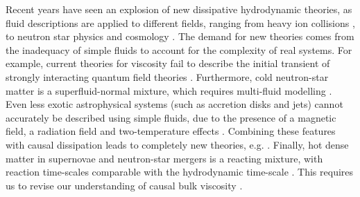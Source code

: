 \documentclass[a4paper, amsfonts, amssymb, amsmath, reprint, showkeys, nofootinbib, twoside, onecolumn,notitlepage]{revtex4-1}
\begin{document}
Recent years have seen an explosion of new dissipative hydrodynamic theories, as fluid descriptions are applied to different fields, ranging from heavy ion collisions  \cite{FlorkowskiReview2018}, to neutron star physics \cite{AnderssonMultifluidPerspective2021} and cosmology \cite{Maartens1995}. The demand for new theories comes from the inadequacy of simple fluids to account for the complexity of real systems.
For example, current theories for viscosity \cite{Israel_Stewart_1979,Liu1986} fail to describe the initial transient of strongly interacting quantum field theories \cite{Denicol_Relaxation_2011, Heller2014}. Furthermore, cold neutron-star matter is a superfluid-normal mixture, which requires multi-fluid modelling \cite{carter1991,Carter_starting_point,langlois98,Gusakov2007,Termo}. Even less exotic astrophysical systems (such as accretion disks and jets) cannot accurately be described using simple fluids, due to the presence of a magnetic field, a radiation field and two-temperature effects \cite{FernandezGRMHD2019,Sadowski2013,Mosibroska2016}. Combining these features with causal dissipation leads to completely new theories, e.g. \cite{AnileRadiazion1992}. Finally, hot dense matter in supernovae and neutron-star mergers is a reacting mixture, with reaction time-scales comparable with the hydrodynamic time-scale \cite{Burrows1986,Alford2020,Nedora2021}. This requires us to revise our understanding of causal bulk viscosity \cite{BulkGavassino}.  
\end{document}
